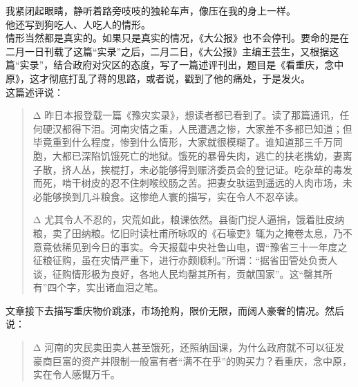 我紧闭起眼睛，静听着路旁吱吱的独轮车声，像压在我的身上一样。\\

他还写到狗吃人、人吃人的情形。\\

情形当然都是真实的。如果只是真实的情况，《大公报》也不会停刊。要命的是在二月一日刊载了这篇“实录”之后，二月二日，《大公报》主编王芸生，又根据这篇“实录”，结合政府对灾区的态度，写了一篇述评刊出，题目是《看重庆，念中原》，这才彻底打乱了蒋的思路，或者说，戳到了他的痛处，于是发火。\\

这篇述评说：\\

\begin{quote}
	\begin{description}
	\item {\Add Δ} 昨日本报登载一篇《豫灾实录》，想读者都已看到了。读了那篇通讯，任何硬汉都得下泪。河南灾情之重，人民遭遇之惨，大家差不多都已知道；但毕竟重到什么程度，惨到什么情形，大家就很模糊了。谁知道那三千万同胞，大都已深陷饥饿死亡的地狱。饿死的暴骨失肉，逃亡的扶老携幼，妻离子散，挤人丛，挨棍打，未必能够得到赈济委员会的登记证。吃杂草的毒发而死，啃干树皮的忍不住刺喉绞肠之苦。把妻女驮运到遥远的人肉市场，未必能够换到几斗粮食。这惨绝人寰的描写，实在令人不忍卒读。\\
	
	\item {\Add Δ} 尤其令人不忍的，灾荒如此，粮课依然。县衙门捉人逼捐，饿着肚皮纳粮，卖了田纳粮。忆旧时读杜甫所咏叹的《石壕吏》辄为之掩卷太息，乃不意竟依稀见到今日的事实。今天报载中央社鲁山电，谓“豫省三十一年度之征粮征购，虽在灾情严重下，进行亦颇顺利。”所谓：“据省田管处负责人谈，征购情形极为良好，各地人民均罄其所有，贡献国家”。这“罄其所有”四个字，实出诸血泪之笔。\\
	\end{description}
\end{quote}


文章接下去描写重庆物价跳涨，市场抢购，限价无限，而阔人豪奢的情况。然后说：\\

\begin{quote}
	\begin{description}
		\item {\Add Δ} 河南的灾民卖田卖人甚至饿死，还照纳国课，为什么政府就不可以征发豪商巨富的资产并限制一般富有者“满不在乎”的购买力？看重庆，念中原，实在令人感慨万千。\\
	\end{description}
\end{quote}

